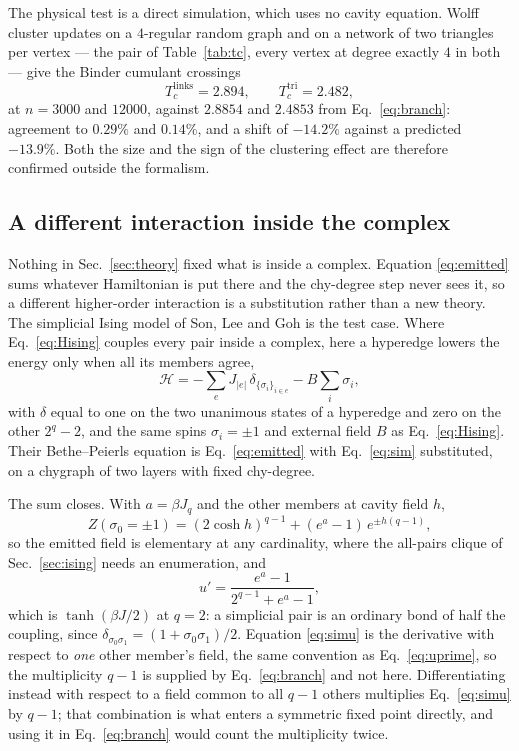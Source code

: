 \documentclass[aps,pre,twocolumn,superscriptaddress,floatfix]{revtex4-2}
\begin{document}
The physical test is a direct simulation, which uses no cavity equation.
Wolff cluster updates on a $4$-regular random graph and on a network of two
triangles per vertex --- the pair of Table~\ref{tab:tc}, every vertex at degree
exactly $4$ in both --- give the Binder cumulant crossings
\begin{equation}
  T_c^{\mathrm{links}}=2.894,\qquad T_c^{\mathrm{tri}}=2.482,
  \label{eq:mc}
\end{equation}
at $n=3000$ and $12000$, against $2.8854$ and $2.4853$ from
Eq.~\eqref{eq:branch}: agreement to $0.29\%$ and $0.14\%$, and a shift of
$-14.2\%$ against a predicted $-13.9\%$. Both the size and the sign of the
clustering effect are therefore confirmed outside the formalism.

\subsection{A different interaction inside the complex}
\label{sec:simplicial}

Nothing in Sec.~\ref{sec:theory} fixed what is inside a complex. Equation
\eqref{eq:emitted} sums whatever Hamiltonian is put there and the chy-degree
step never sees it, so a different higher-order interaction is a substitution
rather than a new theory. The simplicial Ising model of Son, Lee and Goh
\cite{SLG26} is the test case. Where Eq.~\eqref{eq:Hising} couples every pair
inside a complex, here a hyperedge lowers the energy only when all its members
agree,
\begin{equation}
  \mathcal{H}=-\sum_e J_{|e|}\,\delta_{\{\sigma_i\}_{i\in e}}-B\sum_i\sigma_i,
  \label{eq:sim}
\end{equation}
with $\delta$ equal to one on the two unanimous states of a hyperedge and zero
on the other $2^q-2$, and the same spins $\sigma_i=\pm1$ and external field $B$
as Eq.~\eqref{eq:Hising}. Their Bethe--Peierls equation is Eq.~\eqref{eq:emitted} with
Eq.~\eqref{eq:sim} substituted, on a chygraph of two layers with fixed
chy-degree.

The sum closes. With $a=\beta J_q$ and the other members at cavity field $h$,
\begin{equation}
  Z(\sigma_0=\pm1)=(2\cosh h)^{q-1}+(e^{a}-1)\,e^{\pm h(q-1)},
  \label{eq:simZ}
\end{equation}
so the emitted field is elementary at any cardinality, where the all-pairs
clique of Sec.~\ref{sec:ising} needs an enumeration, and
\begin{equation}
  u'=\frac{e^{a}-1}{2^{q-1}+e^{a}-1},
  \label{eq:simu}
\end{equation}
which is $\tanh(\beta J/2)$ at $q=2$: a simplicial pair is an ordinary bond of
half the coupling, since $\delta_{\sigma_0\sigma_1}=(1+\sigma_0\sigma_1)/2$. Equation
\eqref{eq:simu} is the derivative with respect to \emph{one} other member's
field, the same convention as Eq.~\eqref{eq:uprime}, so the multiplicity $q-1$
is supplied by Eq.~\eqref{eq:branch} and not here. Differentiating instead with
respect to a field common to all $q-1$ others multiplies Eq.~\eqref{eq:simu} by
$q-1$; that combination is what enters a symmetric fixed point directly, and
using it in Eq.~\eqref{eq:branch} would count the multiplicity twice.
\end{document}
